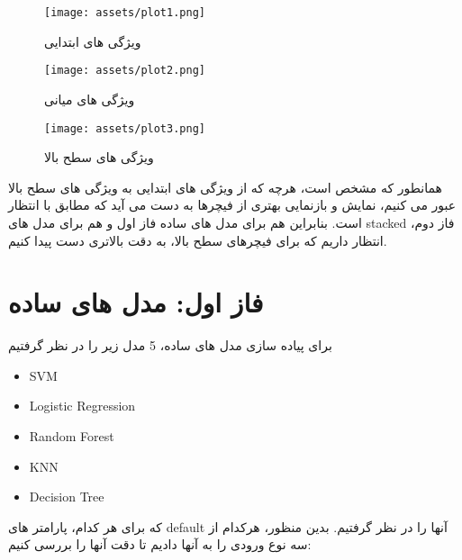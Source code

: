 \documentclass[a4paper,12pt]{article}
\begin{document}
\begin{figure}[h]
	\centering
	\texttt{[image: assets/plot1.png]}
	\caption{\textcolor{CustomAccent}{ویژگی های ابتدایی}}
\end{figure}

\begin{figure}[h]
	\centering
	\texttt{[image: assets/plot2.png]}
	\caption{\textcolor{CustomAccent}{ویژگی های میانی}}
\end{figure}

\begin{figure}[h]
	\centering
	\texttt{[image: assets/plot3.png]}
	\caption{\textcolor{CustomAccent}{ویژگی های سطح بالا}}
\end{figure}

همانطور که مشخص است، هرچه که از ویژگی های ابتدایی به ویژگی های سطح بالا عبور می کنیم، نمایش و بازنمایی بهتری از فیچرها به دست می آید که مطابق با انتظار است. بنابراین هم برای مدل های ساده فاز اول و هم برای مدل های stacked فاز دوم، انتظار داریم که برای فیچرهای سطح بالا، به دقت بالاتری دست پیدا کنیم. 


\pagebreak
\section*{فاز اول: مدل های ساده}
برای پیاده سازی مدل های ساده، 5 مدل زیر را در نظر گرفتیم
\begin{latin}
\begin{itemize}
	\item SVM
	\item Logistic Regression
	\item Random Forest
	\item KNN
	\item Decision Tree
\end{itemize}
\end{latin}
که برای هر کدام، پارامتر های default آنها را در نظر گرفتیم. بدین منظور، هرکدام از سه نوع ورودی را به آنها دادیم تا دقت آنها را بررسی کنیم:
\end{document}
